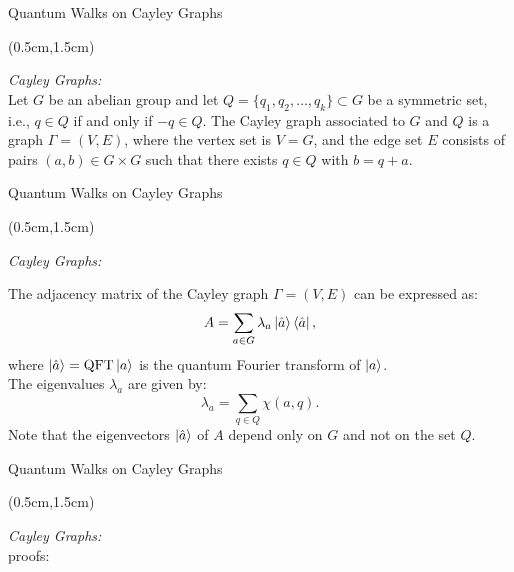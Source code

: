 \documentclass{beamer}
\theoremstyle{definition}
\begin{document}
\begin{frame}{Quantum Walks on Cayley Graphs}
    
    \begin{textblock*}{12cm}(0.5cm,1.5cm)
        
        \textit{Cayley Graphs:} \\
        \vspace{0.3cm}
        Let $G$ be an abelian group and let $Q = \{q_1, q_2, \dots, q_k\} \subset G$ be a symmetric set, i.e., $q \in Q$ if and only if $-q \in Q$. The Cayley graph associated to $G$ and $Q$ is a graph $\Gamma = (V, E)$, where the vertex set is $V = G$, and the edge set $E$ consists of pairs $(a, b) \in G \times G$ such that there exists $q \in Q$ with $b = q + a$. \\
      
    \end{textblock*}

\end{frame}



\begin{frame}{Quantum Walks on Cayley Graphs}
    
    \begin{textblock*}{12cm}(0.5cm,1.5cm)
        
        \textit{Cayley Graphs:} \\
        \vspace{0.3cm}
        
        The adjacency matrix of the Cayley graph $\Gamma = (V,E)$ can be expressed as:
        \[ A = \sum_{a \in G} \lambda_a \ket{\hat{a}} \bra{\hat{a}}, \]
        where $\ket{\hat{a}} = \operatorname{QFT} \ket{a}$ is the quantum Fourier transform of $\ket{a}$. \\
         \vspace{0.5cm}
        The eigenvalues $\lambda_a$ are given by:
        \[ \lambda_a = \sum_{q \in Q} \chi(a, q). \]
        Note that the eigenvectors $\ket{\hat{a}}$ of $A$ depend only on $G$ and not on the set $Q$.
    
    \end{textblock*}


\end{frame}



\begin{frame}{Quantum Walks on Cayley Graphs}
    
    \begin{textblock*}{12cm}(0.5cm,1.5cm)
        
        \textit{Cayley Graphs:} \\
        \vspace{0.3cm}
        proofs:
    \end{textblock*}
\end{frame}
\end{document}
